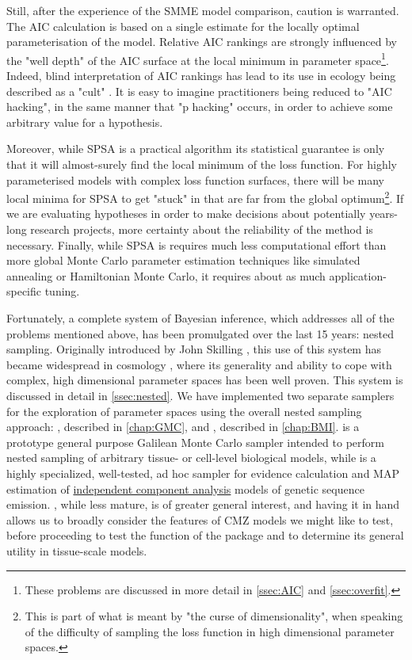 Still, after the experience of the SMME model comparison, caution is warranted. The AIC calculation is based on a single estimate for the locally optimal parameterisation of the model. Relative AIC rankings are strongly influenced by the "well depth" of the AIC surface at the local minimum in parameter space\footnote{These problems are discussed in more detail in \autoref{ssec:AIC} and \autoref{ssec:overfit}.}. Indeed, blind interpretation of AIC rankings has lead to its use in ecology being described as a "cult" \cite{Brewer2020}. It is easy to imagine practitioners being reduced to "AIC hacking", in the same manner that "p hacking" occurs, in order to achieve some arbitrary value for a hypothesis.

Moreover, while SPSA is a practical algorithm its statistical guarantee is only that it will almost-surely find the local minimum of the loss function. For highly parameterised models with complex loss function surfaces, there will be many local minima for SPSA to get "stuck" in that are far from the global optimum\footnote{This is part of what is meant by "the curse of dimensionality", when speaking of the difficulty of sampling the loss function in high dimensional parameter spaces.}. If we are evaluating hypotheses in order to make decisions about potentially years-long research projects, more certainty about the reliability of the method is necessary. Finally, while SPSA is requires much less computational effort than more global Monte Carlo parameter estimation techniques like simulated annealing or Hamiltonian Monte Carlo, it requires about as much application-specific tuning.

Fortunately, a complete system of Bayesian inference, which addresses all of the problems mentioned above, has been promulgated over the last 15 years: nested sampling. Originally introduced by John Skilling \cite{Skilling2006}, this use of this system has became widespread in cosmology \cite{Trotta2008,Feroz2009,Higson2019}, where its generality and ability to cope with complex, high dimensional parameter spaces has been well proven. This system is discussed in detail in \autoref{ssec:nested}. We have implemented two separate samplers for the exploration of parameter spaces using the overall nested sampling approach: , described in \autoref{chap:GMC}, and , described in \autoref{chap:BMI}.  is a prototype general purpose Galilean Monte Carlo sampler intended to perform nested sampling of arbitrary tissue- or cell-level biological models, while  is a highly specialized, well-tested, ad hoc sampler for evidence calculation and MAP estimation of \hyperref[ssec:ICA]{independent component analysis} models of genetic sequence emission. , while less mature, is of greater general interest, and having it in hand allows us to broadly consider the features of CMZ models we might like to test, before proceeding to test the function of the package and to determine its general utility in tissue-scale models.

